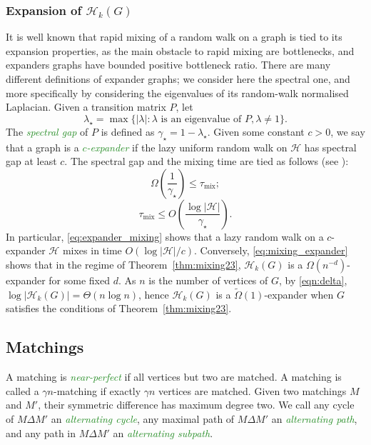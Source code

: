 \documentclass[11pt,a4paper]{article}
\theoremstyle{definition}
\DeclareMathOperator{\mix}{mix}
\newcommand{\defin}[1]{\emph{\textcolor{ForestGreen}{#1}}}
\begin{document}
\subsubsection*{Expansion of $\mathcal H_k(G)$}
It is well known that rapid mixing of a random walk on a graph is tied to
its expansion properties, as the main obstacle to rapid mixing are bottlenecks,
and expanders graphs have bounded positive bottleneck ratio. There are many
different definitions of expander graphs; we consider here the spectral one, and
more specifically by considering the eigenvalues of its random-walk normalised
Laplacian. Given a transition matrix $P$, let
$$\lambda_\star = \max \{|\lambda| \colon \lambda \text{ is an eigenvalue of } P,
\lambda \neq 1\}.$$ The \defin{spectral gap} of $P$ is defined as
$\gamma_\star = 1-\lambda_\star$. Given some constant $c>0$, we say that a graph
is a \defin{$c$-expander} if the
lazy uniform random walk on $\mathcal H$ has spectral gap at least $c$. The spectral gap
and the mixing time are tied as follows (see
\cite[Theorems 12.5 and 12.4]{levin2017Markov}):
\begin{equation}\label{eq:expander_mixing}
  \Omega\left(\frac1{\gamma_\star}\right) \le \tau_{\mix};
\end{equation}
\begin{equation}\label{eq:mixing_expander}
  \tau_{{\mix}} \le O\left(\frac{\log |{\mathcal H}|}{\gamma_\star}\right).
\end{equation}
In particular, \eqref{eq:expander_mixing} shows that a lazy random walk on a
$c$-expander ${\mathcal H}$ mixes in time $O(\log |{\mathcal H}|/c)$. Conversely,
\eqref{eq:mixing_expander} shows that in the regime of Theorem~\ref{thm:mixing23},
$\mathcal{H}_k(G)$ is a {$\Omega(n^{-d})$-expander} for some fixed $d$. As $n$
is the number of vertices of $G$, by \eqref{eqn:delta}, $\log |\mathcal{H}_k(G)| = \Theta(n\log
n)$, hence $\mathcal{H}_k(G)$ is a $\tilde{\Omega}(1)$-expander when $G$
satisfies the conditions of Theorem~\ref{thm:mixing23}.

\subsection{Matchings}
A matching is \defin{near-perfect} if all vertices but two are matched. 
A matching is called a $\gamma n$-matching if exactly $\gamma n$ vertices are
matched. Given two matchings $M$ and $M'$, their symmetric difference has
maximum degree two. We call any cycle of $M \Delta M'$ an \defin{alternating cycle},
 any maximal path of $M \Delta M'$ an \defin{alternating path}, and any path in $M \Delta M'$ an \defin{alternating subpath}.
 
\end{document}
